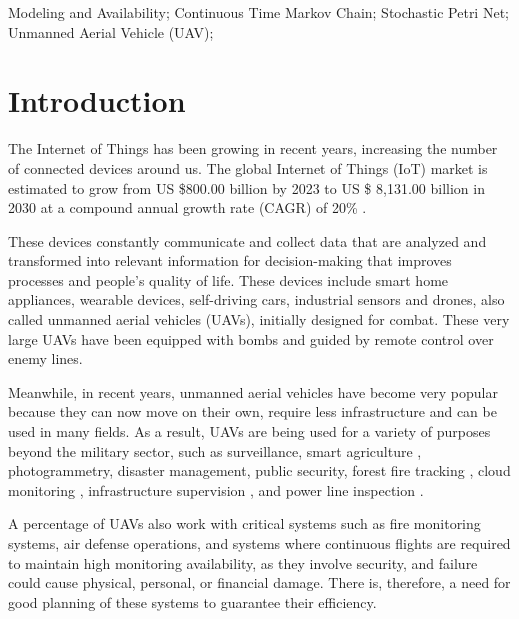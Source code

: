 \documentclass[conference]{IEEEtran}
\begin{document}
\begin{IEEEkeywords}
Modeling and Availability; Continuous Time Markov Chain; Stochastic Petri Net; Unmanned Aerial Vehicle (UAV);
\end{IEEEkeywords}

\section{Introduction}\label{sec:introduction}

The Internet of Things has been growing in recent years, increasing the number of connected devices around us. The global Internet of Things (IoT) market is estimated to grow from US \$800.00 billion by 2023 to US \$ 8,131.00 billion in 2030 at a compound annual growth rate (CAGR) of 20\% \citep{al2020internet}.

These devices constantly communicate and collect data that are analyzed and transformed into relevant information for decision-making that improves processes and people’s quality of life. These devices include smart home appliances, wearable devices, self-driving cars, industrial sensors and drones, also called unmanned aerial vehicles (UAVs), initially designed for combat. These very large UAVs have been equipped with bombs and guided by remote control over enemy lines.

Meanwhile, in recent years, unmanned aerial vehicles have become very popular because they can now move on their own, require less infrastructure and can be used in many fields. As a result, UAVs are being used for a variety of purposes beyond the military sector, such as surveillance\citep{basilico2015deploying}, smart agriculture \citep{lottes2017uav}, photogrammetry\citep{cesetti2011visual}, disaster management, public security\citep {maza2011experimental}, forest fire tracking \citep{pham2017distributed}, cloud monitoring \citep{renzaglia2016monitoring}, infrastructure supervision \citep{guerrero2013uav}, and power line inspection \citep{chang2017development}.

A percentage of UAVs also work with critical systems such as fire monitoring systems, air defense operations, and systems where continuous flights are required to maintain high monitoring availability, as they involve security, and failure could cause physical, personal, or financial damage. There is, therefore, a need for good planning of these systems to guarantee their efficiency.

\end{document}
